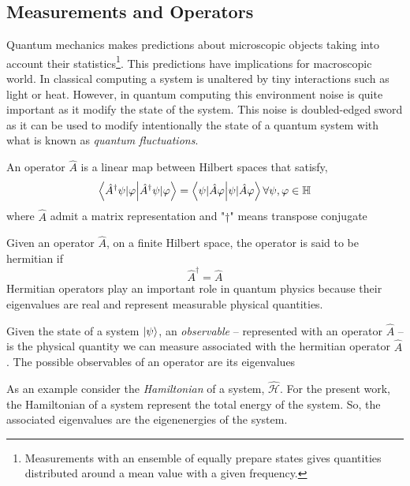 \subsection{Measurements and Operators}
Quantum mechanics makes predictions about microscopic objects taking into account their statistics\footnote{Measurements with an ensemble of equally prepare states gives quantities distributed around a mean value with a given frequency.}. This predictions have implications for macroscopic world. In classical computing a system is unaltered by tiny interactions such as light or heat. However, in quantum computing this environment noise is quite important as it modify the state of the system. This noise is doubled-edged sword as it can be used to modify intentionally the state of a quantum system with what is known as \textit{quantum fluctuations}.
\begin{definition}[Operator]
    An operator $\hat{A}$ is a linear map between Hilbert spaces that satisfy,
    \begin{equation}
        \braket{\hat{A}^{\dagger}\psi|\varphi} = \braket{\psi|\hat{A}\varphi} \forall \psi,\varphi \in \mathbb{H}
    \end{equation}
    where $\hat{A}$ admit a matrix representation and "$\dagger$" means transpose conjugate
\end{definition}
\begin{corollary}
    Given an operator $\hat{A}$, on a finite Hilbert space, the operator is said to be hermitian if
    \begin{equation}
        \hat{A}^{\dagger} = \hat{A}
    \end{equation}
    Hermitian operators play an important role in quantum physics because their eigenvalues are real and represent measurable physical quantities.
\end{corollary}
\begin{definition}[Observable]
    Given the state of a system $\ket{\psi}$, an \textit{observable} -- represented with an operator $\hat{A}$ -- is the physical quantity we can measure associated with the hermitian operator $\hat{A}$. The possible observables of an operator are its eigenvalues\\
\end{definition}
\begin{flushleft}
   As an example consider the \textit{Hamiltonian} of a system, $\hat{\mathcal{H}}$. For the present work, the Hamiltonian of a system represent the total energy of the system. So, the associated eigenvalues are the eigenenergies of the system.  
\end{flushleft}
